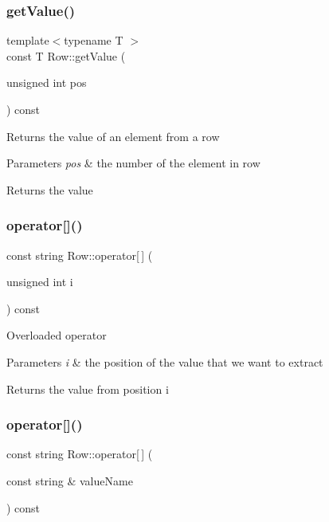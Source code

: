 \subsubsection{\texorpdfstring{get\+Value()}{getValue()}}
{\footnotesize\ttfamily template$<$typename T $>$ \\
const T Row\+::get\+Value (\begin{DoxyParamCaption}\item[{unsigned int}]{pos }\end{DoxyParamCaption}) const\hspace{0.3cm}{\ttfamily [inline]}}

Returns the value of an element from a row 
\begin{DoxyParams}{Parameters}
{\em pos} & the number of the element in row \\
\hline
\end{DoxyParams}
\begin{DoxyReturn}{Returns}
the value 
\end{DoxyReturn}
\mbox{\label{class_row_a705ecee70126716fbe16337e4a2b8764}} 
\subsubsection{\texorpdfstring{operator[]()}{operator[]()}\hspace{0.1cm}{\footnotesize\ttfamily [1/2]}}
{\footnotesize\ttfamily const string Row\+::operator\mbox{[}$\,$\mbox{]} (\begin{DoxyParamCaption}\item[{unsigned int}]{i }\end{DoxyParamCaption}) const}

Overloaded operator 
\begin{DoxyParams}{Parameters}
{\em i} & the position of the value that we want to extract \\
\hline
\end{DoxyParams}
\begin{DoxyReturn}{Returns}
the value from position i 
\end{DoxyReturn}
\mbox{\label{class_row_a42f23dd69d591da253b7428647f16ff8}} 
\subsubsection{\texorpdfstring{operator[]()}{operator[]()}\hspace{0.1cm}{\footnotesize\ttfamily [2/2]}}
{\footnotesize\ttfamily const string Row\+::operator\mbox{[}$\,$\mbox{]} (\begin{DoxyParamCaption}\item[{const string \&}]{value\+Name }\end{DoxyParamCaption}) const}

